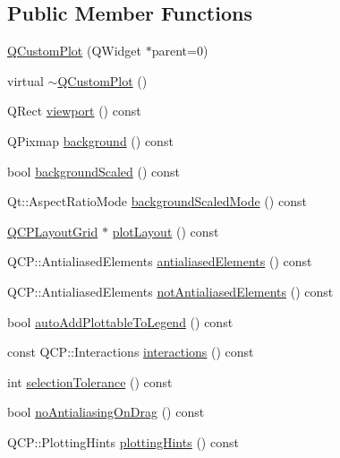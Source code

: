 \subsection*{Public Member Functions}
\begin{DoxyCompactItemize}
\item 
\hyperlink{class_q_custom_plot_a45b99626558651a6428b83972b0b34b8}{Q\+Custom\+Plot} (Q\+Widget $\ast$parent=0)
\item 
virtual \hyperlink{class_q_custom_plot_a75d9b6f599dcae706e45efd425c5499e}{$\sim$\+Q\+Custom\+Plot} ()
\item 
Q\+Rect \hyperlink{class_q_custom_plot_a953ecdbc28018e7e84cb6213ad3d88c2}{viewport} () const 
\item 
Q\+Pixmap \hyperlink{class_q_custom_plot_a4643ddc8249cc4f51725650677c2b779}{background} () const 
\item 
bool \hyperlink{class_q_custom_plot_af9a6e0fe88e4b8ae5504ee9646abb121}{background\+Scaled} () const 
\item 
Qt\+::\+Aspect\+Ratio\+Mode \hyperlink{class_q_custom_plot_a3394512baf54fbcdc7613ac44a07c3b6}{background\+Scaled\+Mode} () const 
\item 
\hyperlink{class_q_c_p_layout_grid}{Q\+C\+P\+Layout\+Grid} $\ast$ \hyperlink{class_q_custom_plot_afd280d4d621ae64a106543a545c508d7}{plot\+Layout} () const 
\item 
Q\+C\+P\+::\+Antialiased\+Elements \hyperlink{class_q_custom_plot_a81e954fbb485bb44c609e5707f0067b3}{antialiased\+Elements} () const 
\item 
Q\+C\+P\+::\+Antialiased\+Elements \hyperlink{class_q_custom_plot_a8060cee59757213764382a78d3196189}{not\+Antialiased\+Elements} () const 
\item 
bool \hyperlink{class_q_custom_plot_ad1599fc3fd1833b5988f6b89c1f616ca}{auto\+Add\+Plottable\+To\+Legend} () const 
\item 
const Q\+C\+P\+::\+Interactions \hyperlink{class_q_custom_plot_a12401c02b6949a717f5749bb28c62983}{interactions} () const 
\item 
int \hyperlink{class_q_custom_plot_a7b738074c75e80070ef6a10263c6cd69}{selection\+Tolerance} () const 
\item 
bool \hyperlink{class_q_custom_plot_ae07f2895a34d13a97a10cae4d8e17a36}{no\+Antialiasing\+On\+Drag} () const 
\item 
Q\+C\+P\+::\+Plotting\+Hints \hyperlink{class_q_custom_plot_a130b55e205697a5288081e9fc11e443e}{plotting\+Hints} () const 
\item 

\end{DoxyCompactItemize}
